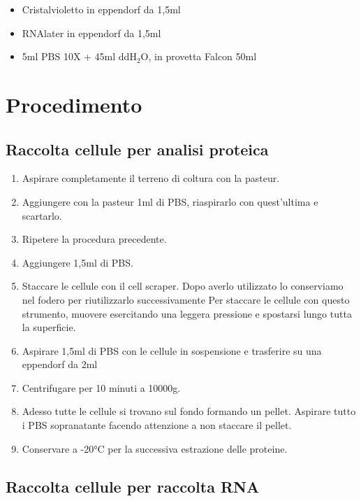 \begin{itemize}
\item Cristalvioletto in eppendorf da 1,5ml
\item RNAlater in eppendorf da 1,5ml
\item 5ml PBS 10X + 45ml ddH$_2$O, in provetta Falcon 50ml
\end{itemize}

\section{Procedimento}

\subsection{Raccolta cellule per analisi proteica}

\begin{enumerate}

\item Aspirare completamente il terreno di coltura con la pasteur.
\item Aggiungere con la pasteur 1ml di PBS, riaspirarlo con quest'ultima e scartarlo.
\item Ripetere la procedura precedente.
\item Aggiungere 1,5ml di PBS.
\item Staccare le cellule con il cell scraper.
Dopo averlo utilizzato lo conserviamo nel fodero per riutilizzarlo successivamente
Per staccare le cellule con questo strumento, muovere esercitando una leggera pressione
e spostarsi lungo tutta la superficie.
\item Aspirare 1,5ml di PBS con le cellule in sospensione e trasferire su una eppendorf da 2ml
\item Centrifugare per 10 minuti a 10000g.
\item Adesso tutte le cellule si trovano sul fondo formando un pellet. Aspirare tutto
i PBS sopranatante facendo attenzione a non staccare il pellet.
\item Conservare a -20°C per la successiva estrazione delle proteine.

\end{enumerate}

\subsection{Raccolta cellule per raccolta RNA}

